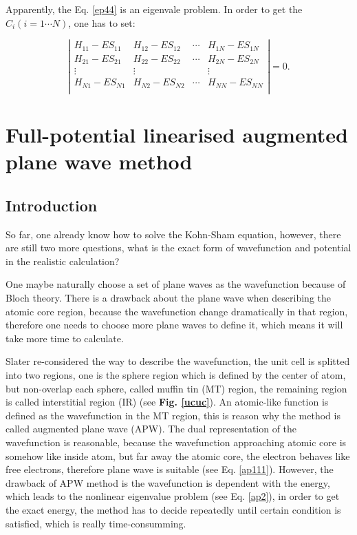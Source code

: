 \documentclass[a4paper, 12pt, titlepage,oneside,drop]{kthesis}
\begin{document}
Apparently, the Eq. \ref{ep44} is an eigenvale problem. In order to get the $C_{i} (i=1 \cdots N)$, one has to set:

\begin{equation}\label{ep4}
\left|
\begin{matrix}
    H_{11} - E S_{11} & H_{12} - E S_{12} & \cdots & H_{1N} - E S_{1N} \\
   H_{21} - E S_{21} & H_{22} - E S_{22} & \cdots & H_{2N} - E S_{2N} \\
    \vdots               & \vdots               &        & \vdots               \\
  H_{N1} - E S_{N1} & H_{N2} - E S_{N2} & \cdots & H_{NN} - E S_{NN} \\
\end{matrix} \right|
=0.
\end{equation}

\section{Full-potential linearised augmented plane wave method}
\subsection{Introduction}

So far, one already know how to solve the Kohn-Sham equation, however, there are still two more questions, what is the exact form of 
wavefunction and potential in the realistic calculation?  

One maybe naturally choose a set of plane waves as the wavefunction because of Bloch theory. There is a drawback about the plane wave 
when describing the atomic core region, because the wavefunction change dramatically in that region, therefore one needs to choose more plane
waves to define it, which means it will take more time to calculate.

Slater re-considered the way to describe the wavefunction, the unit cell is splitted into two regions, one is the sphere region which is
defined by the center of atom, but non-overlap each sphere, called muffin tin (MT) region, the remaining region is called interstitial 
region (IR) (see \textbf{Fig. \ref{ucuc}}). An atomic-like function is defined as the wavefunction in the MT region, this is reason why the method is called augmented plane wave (APW).
The dual representation of the wavefunction is reasonable, because the wavefunction approaching atomic core is somehow like inside atom, but far away the atomic core, the electron behaves like free electrons,
therefore plane wave is suitable (see Eq. \ref{ap111}). However, the drawback of APW method is the wavefunction is dependent with the energy, which leads to the 
nonlinear eigenvalue problem (see Eq. \ref{ap2}), in order to get the exact energy, the method has to decide repeatedly until certain condition is satisfied,
which is really time-consumming.
\end{document}
